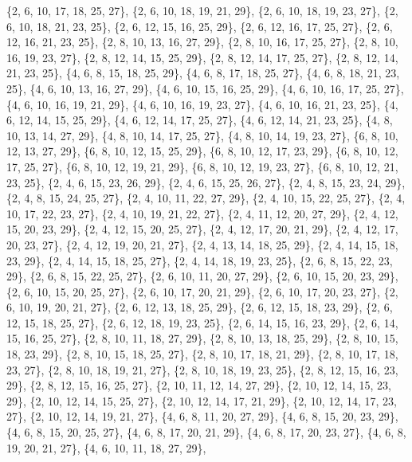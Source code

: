 \documentclass[11pt,a4paper]{article}
\begin{document}
{\{2, 6, 10, 17, 18, 25, 27\}, \{2, 6, 10, 18, 19, 21, 29\}, \{2, 6, 10, 18, 19, 23, 27\}, \{2, 6, 10, 18, 21, 23, 25\}, \{2, 6, 12, 15, 16, 25, 29\},
\{2, 6, 12, 16, 17, 25, 27\}, \{2, 6, 12, 16, 21, 23, 25\}, \{2, 8, 10, 13, 16, 27, 29\}, \{2, 8, 10, 16, 17, 25, 27\}, \{2, 8, 10, 16, 19, 23, 27\},
\{2, 8, 12, 14, 15, 25, 29\}, \{2, 8, 12, 14, 17, 25, 27\}, \{2, 8, 12, 14, 21, 23, 25\}, \{4, 6, 8, 15, 18, 25, 29\}, \{4, 6, 8, 17, 18, 25, 27\},
\{4, 6, 8, 18, 21, 23, 25\}, \{4, 6, 10, 13, 16, 27, 29\}, \{4, 6, 10, 15, 16, 25, 29\}, \{4, 6, 10, 16, 17, 25, 27\}, \{4, 6, 10, 16, 19, 21, 29\},
\{4, 6, 10, 16, 19, 23, 27\}, \{4, 6, 10, 16, 21, 23, 25\}, \{4, 6, 12, 14, 15, 25, 29\}, \{4, 6, 12, 14, 17, 25, 27\}, \{4, 6, 12, 14, 21, 23, 25\},
\{4, 8, 10, 13, 14, 27, 29\}, \{4, 8, 10, 14, 17, 25, 27\}, \{4, 8, 10, 14, 19, 23, 27\}, \{6, 8, 10, 12, 13, 27, 29\}, \{6, 8, 10, 12, 15, 25, 29\},
\{6, 8, 10, 12, 17, 23, 29\}, \{6, 8, 10, 12, 17, 25, 27\}, \{6, 8, 10, 12, 19, 21, 29\}, \{6, 8, 10, 12, 19, 23, 27\}, \{6, 8, 10, 12, 21, 23, 25\},
\{2, 4, 6, 15, 23, 26, 29\}, \{2, 4, 6, 15, 25, 26, 27\}, \{2, 4, 8, 15, 23, 24, 29\}, \{2, 4, 8, 15, 24, 25, 27\}, \{2, 4, 10, 11, 22, 27, 29\},
\{2, 4, 10, 15, 22, 25, 27\}, \{2, 4, 10, 17, 22, 23, 27\}, \{2, 4, 10, 19, 21, 22, 27\}, \{2, 4, 11, 12, 20, 27, 29\}, \{2, 4, 12, 15, 20, 23, 29\},
\{2, 4, 12, 15, 20, 25, 27\}, \{2, 4, 12, 17, 20, 21, 29\}, \{2, 4, 12, 17, 20, 23, 27\}, \{2, 4, 12, 19, 20, 21, 27\}, \{2, 4, 13, 14, 18, 25, 29\},
\{2, 4, 14, 15, 18, 23, 29\}, \{2, 4, 14, 15, 18, 25, 27\}, \{2, 4, 14, 18, 19, 23, 25\}, \{2, 6, 8, 15, 22, 23, 29\}, \{2, 6, 8, 15, 22, 25, 27\},
\{2, 6, 10, 11, 20, 27, 29\}, \{2, 6, 10, 15, 20, 23, 29\}, \{2, 6, 10, 15, 20, 25, 27\}, \{2, 6, 10, 17, 20, 21, 29\}, \{2, 6, 10, 17, 20, 23, 27\},
\{2, 6, 10, 19, 20, 21, 27\}, \{2, 6, 12, 13, 18, 25, 29\}, \{2, 6, 12, 15, 18, 23, 29\}, \{2, 6, 12, 15, 18, 25, 27\}, \{2, 6, 12, 18, 19, 23, 25\},
\{2, 6, 14, 15, 16, 23, 29\}, \{2, 6, 14, 15, 16, 25, 27\}, \{2, 8, 10, 11, 18, 27, 29\}, \{2, 8, 10, 13, 18, 25, 29\}, \{2, 8, 10, 15, 18, 23, 29\},
\{2, 8, 10, 15, 18, 25, 27\}, \{2, 8, 10, 17, 18, 21, 29\}, \{2, 8, 10, 17, 18, 23, 27\}, \{2, 8, 10, 18, 19, 21, 27\}, \{2, 8, 10, 18, 19, 23, 25\},
\{2, 8, 12, 15, 16, 23, 29\}, \{2, 8, 12, 15, 16, 25, 27\}, \{2, 10, 11, 12, 14, 27, 29\}, \{2, 10, 12, 14, 15, 23, 29\}, \{2, 10, 12, 14, 15, 25, 27\},
\{2, 10, 12, 14, 17, 21, 29\}, \{2, 10, 12, 14, 17, 23, 27\}, \{2, 10, 12, 14, 19, 21, 27\}, \{4, 6, 8, 11, 20, 27, 29\}, \{4, 6, 8, 15, 20, 23, 29\},
\{4, 6, 8, 15, 20, 25, 27\}, \{4, 6, 8, 17, 20, 21, 29\}, \{4, 6, 8, 17, 20, 23, 27\}, \{4, 6, 8, 19, 20, 21, 27\}, \{4, 6, 10, 11, 18, 27, 29\},
}
\end{document}
